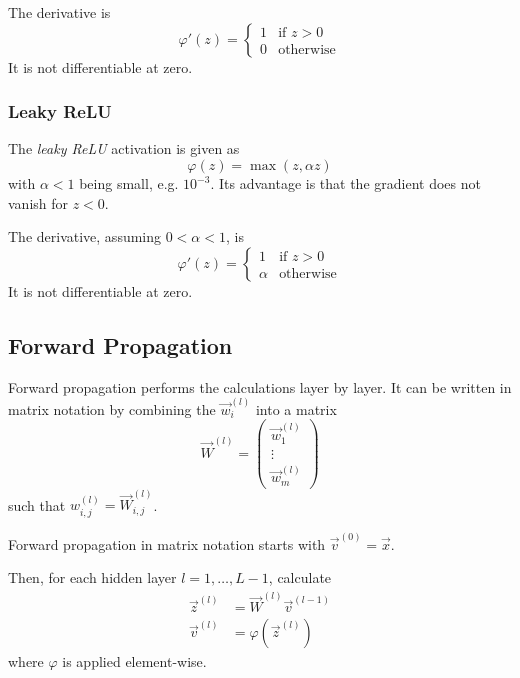 The derivative is
\begin{equation*}
\varphi'(z) =
\begin{cases}
1 & \text{if $z > 0$} \\
0 & \text{otherwise}
\end{cases}
\end{equation*}
It is not differentiable at zero.

\subsubsection{Leaky ReLU}
The \emph{leaky ReLU} activation is given as
\begin{equation*}
\varphi(z) = \max(z, \alpha z)
\end{equation*}
with $\alpha < 1$ being small, e.g. $10^{-3}$.
Its advantage is that the gradient does not
vanish for $z < 0$.

The derivative, assuming $0 < \alpha < 1$, is
\begin{equation*}
\varphi'(z) =
\begin{cases}
1 & \text{if $z > 0$} \\
\alpha & \text{otherwise}
\end{cases}
\end{equation*}
It is not differentiable at zero.


\subsection{Forward Propagation}
Forward propagation performs the calculations layer by layer.
It can be written in matrix notation by combining the
$\vec{w}_i^{(l)}$ into a matrix
\begin{equation*}
\vec{W}^{(l)} =
\begin{pmatrix}
\vec{w}_1^{(l)} \\
\vdots \\
\vec{w}_m^{(l)}
\end{pmatrix}
\end{equation*}
such that $w_{i,j}^{(l)} = \vec{W}_{i,j}^{(l)}$.

Forward propagation in matrix notation starts with
$\vec{v}^{(0)} = \vec{x}$.

Then, for each hidden layer $l = 1, \dotsc, L - 1$,
calculate
\begin{align*}
\vec{z}^{(l)} &= \vec{W}^{(l)} \vec{v}^{(l-1)} \\
\vec{v}^{(l)} &= \varphi(\vec{z}^{(l)})
\end{align*}
where $\varphi$ is applied element-wise.

